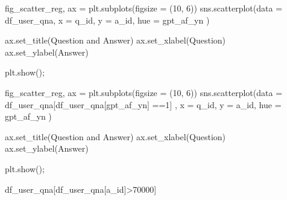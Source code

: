 \documentclass[
  letterpaper,
  DIV=11,
  numbers=noendperiod]{scrartcl}
\newenvironment{Shaded}{\begin{snugshade}}{\end{snugshade}}
\newcommand{\DecValTok}[1]{\textcolor[rgb]{0.68,0.00,0.00}{#1}}
\newcommand{\NormalTok}[1]{\textcolor[rgb]{0.00,0.23,0.31}{#1}}
\newcommand{\OperatorTok}[1]{\textcolor[rgb]{0.37,0.37,0.37}{#1}}
\newcommand{\StringTok}[1]{\textcolor[rgb]{0.13,0.47,0.30}{#1}}
\begin{document}
\begin{Shaded}
\begin{Highlighting}[]
\NormalTok{fig\_scatter\_reg, ax }\OperatorTok{=}\NormalTok{ plt.subplots(figsize }\OperatorTok{=}\NormalTok{ (}\DecValTok{10}\NormalTok{, }\DecValTok{6}\NormalTok{))}
\NormalTok{sns.scatterplot(data }\OperatorTok{=}\NormalTok{ df\_user\_qna, x }\OperatorTok{=} \StringTok{\textquotesingle{}q\_id\textquotesingle{}}\NormalTok{, y }\OperatorTok{=} \StringTok{\textquotesingle{}a\_id\textquotesingle{}}\NormalTok{, hue }\OperatorTok{=} \StringTok{\textquotesingle{}gpt\_af\_yn\textquotesingle{}}\NormalTok{ )}

\NormalTok{ax.set\_title(}\StringTok{\textquotesingle{}Question and Answer\textquotesingle{}}\NormalTok{)}
\NormalTok{ax.set\_xlabel(}\StringTok{\textquotesingle{}Question\textquotesingle{}}\NormalTok{)}
\NormalTok{ax.set\_ylabel(}\StringTok{\textquotesingle{}Answer\textquotesingle{}}\NormalTok{)}


\NormalTok{plt.show()}\OperatorTok{;}
\end{Highlighting}
\end{Shaded}

\begin{Shaded}
\begin{Highlighting}[]
\NormalTok{fig\_scatter\_reg, ax }\OperatorTok{=}\NormalTok{ plt.subplots(figsize }\OperatorTok{=}\NormalTok{ (}\DecValTok{10}\NormalTok{, }\DecValTok{6}\NormalTok{))}
\NormalTok{sns.scatterplot(data }\OperatorTok{=}\NormalTok{ df\_user\_qna[df\_user\_qna[}\StringTok{\textquotesingle{}gpt\_af\_yn\textquotesingle{}}\NormalTok{] }\OperatorTok{==}\DecValTok{1}\NormalTok{] , x }\OperatorTok{=} \StringTok{\textquotesingle{}q\_id\textquotesingle{}}\NormalTok{, y }\OperatorTok{=} \StringTok{\textquotesingle{}a\_id\textquotesingle{}}\NormalTok{, hue }\OperatorTok{=} \StringTok{\textquotesingle{}gpt\_af\_yn\textquotesingle{}}\NormalTok{ )}

\NormalTok{ax.set\_title(}\StringTok{\textquotesingle{}Question and Answer\textquotesingle{}}\NormalTok{)}
\NormalTok{ax.set\_xlabel(}\StringTok{\textquotesingle{}Question\textquotesingle{}}\NormalTok{)}
\NormalTok{ax.set\_ylabel(}\StringTok{\textquotesingle{}Answer\textquotesingle{}}\NormalTok{)}


\NormalTok{plt.show()}\OperatorTok{;}
\end{Highlighting}
\end{Shaded}

\begin{Shaded}
\begin{Highlighting}[]
\NormalTok{df\_user\_qna[df\_user\_qna[}\StringTok{\textquotesingle{}a\_id\textquotesingle{}}\NormalTok{]}\OperatorTok{\textgreater{}}\DecValTok{70000}\NormalTok{]}
\end{Highlighting}
\end{Shaded}
\end{document}
